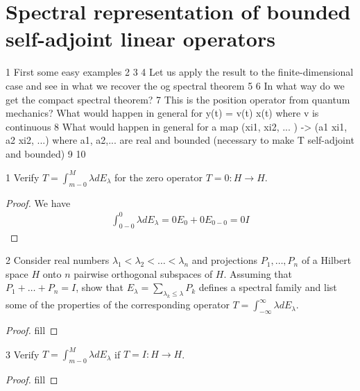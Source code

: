 \section{Spectral representation of bounded self-adjoint linear operators}

1 First some easy examples
2
3
4 Let us apply the result to the finite-dimensional case and see in what we recover the og spectral theorem
5
6 In what way do we get the compact spectral theorem?
7 This is the position operator from quantum mechanics? What would happen in general for y(t) = v(t) x(t) where v is continuous
8 What would happen in general for a map (xi1, xi2, ... ) -> (a1 xi1, a2 xi2, ...)   where a1, a2,... are real and bounded (necessary to make T self-adjoint and bounded)
9
10

\begin{exercise}{1}
Verify $T = \int_{m-0}^M \lambda d E_\lambda$ for the zero operator $T = 0: H \to H$.
\end{exercise}
\begin{proof}
We have
\begin{align*}
    \int_{0 - 0}^0 \lambda d E_\lambda 
    = 0 E_0 + 0 E_{0 - 0} = 0 I
\end{align*}
\end{proof} 

\begin{exercise}{2}
Consider real numbers $\lambda_1 < \lambda_2 < \dots < \lambda_n$ and projections $P_1, \dots, P_n$ of a Hilbert space $H$ onto $n$ pairwise orthogonal subspaces of $H$.
Assuming that $P_1 + \dots + P_n = I$, show that $E_\lambda = \sum_{\lambda_k \leq \lambda} P_k$ defines a spectral family and list some of the properties of the corresponding operator $T = \int_{-\infty}^\infty \lambda d E_\lambda$.
\end{exercise}
\begin{proof}
fill
\end{proof} 

\begin{exercise}{3}
Verify $T = \int_{m-0}^M \lambda d E_\lambda$ if $T = I: H \to H$.
\end{exercise}
\begin{proof}
fill
\end{proof} 

